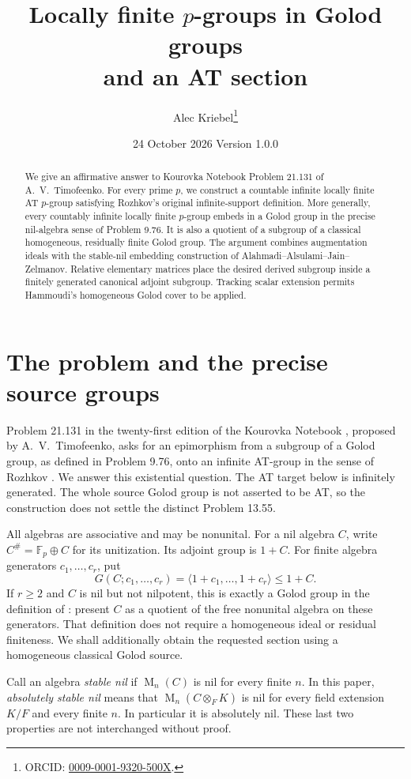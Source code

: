 \documentclass[11pt]{article}
\title{Locally finite \(p\)-groups in Golod groups\\and an AT section}
\author{Alec Kriebel\thanks{ORCID: \href{https://orcid.org/0009-0001-9320-500X}{0009-0001-9320-500X}.}}
\date{24 October 2026 \quad Version 1.0.0}
\theoremstyle{definition}
\newcommand{\Fp}{\mathbb F_p}
\newcommand{\Mat}{\operatorname{M}}
\begin{document}
\maketitle
\begin{abstract}
We give an affirmative answer to Kourovka Notebook Problem 21.131 of
A.~V.~Timofeenko. For every prime \(p\), we construct a countable infinite
locally finite AT \(p\)-group satisfying Rozhkov's original infinite-support
definition. More generally, every countably infinite locally finite
\(p\)-group embeds in a Golod group in the precise nil-algebra sense of
Problem 9.76. It is also a quotient of a subgroup of a classical homogeneous,
residually finite Golod group. The argument combines augmentation ideals
with the stable-nil embedding construction of
Alahmadi--Alsulami--Jain--Zelmanov. Relative elementary matrices place the
desired derived subgroup inside a finitely generated canonical adjoint
subgroup. Tracking scalar extension permits Hammoudi's homogeneous Golod
cover to be applied.
\end{abstract}

\section{The problem and the precise source groups}

Problem 21.131 in the twenty-first edition of the Kourovka Notebook
\cite[p.~199]{KN}, proposed by A.~V.~Timofeenko, asks for an epimorphism
from a subgroup of a Golod group, as defined in Problem 9.76, onto an
infinite AT-group in the sense of Rozhkov \cite{Rozhkov}. We answer this
existential question. The AT target below is infinitely generated.
The whole source Golod group is not asserted to be AT, so the construction
does not settle the distinct Problem 13.55.

All algebras are associative and may be nonunital. For a nil algebra \(C\),
write \(C^\#=\Fp\oplus C\) for its unitization. Its adjoint group is \(1+C\).
For finite algebra generators \(c_1,\ldots,c_r\), put
\[
 G(C;c_1,\ldots,c_r)=\langle 1+c_1,\ldots,1+c_r\rangle\leq 1+C.
\]
If \(r\geq2\) and \(C\) is nil but not nilpotent, this is exactly a
Golod group in the definition of \cite[Problem 9.76, p.~38]{KN}: present
\(C\) as a quotient of the free nonunital algebra on these generators.
That definition does not require a homogeneous ideal or residual
finiteness. We shall additionally obtain the requested section using
a homogeneous classical Golod source.

Call an algebra \emph{stable nil} if \(\Mat_n(C)\) is nil for every finite
\(n\). In this paper, \emph{absolutely stable nil} means that
\(\Mat_n(C\otimes_F K)\) is nil for every field extension \(K/F\) and
every finite \(n\). In particular it is absolutely nil.
These last two properties are not interchanged without proof.
\end{document}
